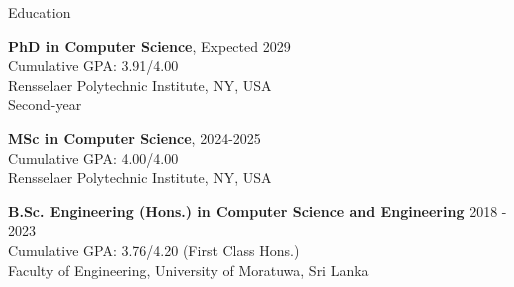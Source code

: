 \documentclass{resume} %
\begin{document}

\begin{rSection}{Education}

{\bf PhD in Computer Science}, \hfill {Expected 2029}\\
Cumulative GPA: 3.91/4.00\\
Rensselaer Polytechnic Institute, NY, USA \\
Second-year 

{\bf MSc in Computer Science}, \hfill {2024-2025}\\
Cumulative GPA: 4.00/4.00\\
Rensselaer Polytechnic Institute, NY, USA 

{\bf B.Sc. Engineering (Hons.) in Computer Science and Engineering} \hfill {2018 - 2023}\\
Cumulative GPA: 3.76/4.20 (First Class Hons.) \\
Faculty of Engineering,
University of Moratuwa, Sri Lanka 
\end{rSection}



\end{document}

